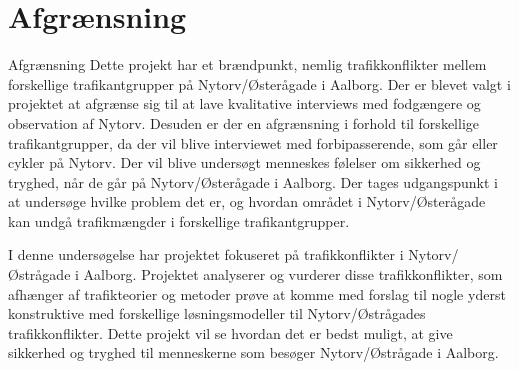 \chapter{Afgrænsning}
\label{chap:Afgrænsning}

Afgrænsning 
Dette projekt har et brændpunkt, nemlig trafikkonflikter mellem forskellige trafikantgrupper på Nytorv/Østerågade i Aalborg. Der er blevet valgt i projektet at afgrænse sig til at lave kvalitative interviews med fodgængere og observation af Nytorv. Desuden er der en afgrænsning i forhold til forskellige trafikantgrupper, da der vil blive interviewet med forbipasserende, som går eller cykler på Nytorv. Der vil blive undersøgt menneskes følelser om sikkerhed og tryghed, når de går på Nytorv/Østerågade i Aalborg. Der tages udgangspunkt i at undersøge hvilke problem det er, og hvordan området i Nytorv/Østerågade kan undgå trafikmængder i forskellige trafikantgrupper. 

I denne undersøgelse har projektet fokuseret på trafikkonflikter i Nytorv/Østrågade i Aalborg. Projektet analyserer og vurderer disse trafikkonflikter, som afhænger af trafikteorier og metoder prøve at komme med forslag til nogle yderst konstruktive med forskellige løsningsmodeller til Nytorv/Østrågades trafikkonflikter.  Dette projekt vil se hvordan det er bedst muligt, at give sikkerhed og tryghed til menneskerne som besøger Nytorv/Østrågade i Aalborg. 
